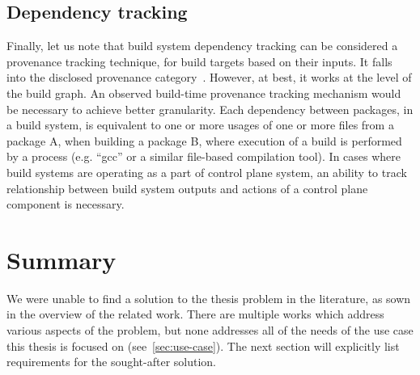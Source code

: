 \subsection{Dependency tracking}

Finally, let us note that build system dependency tracking can be considered a provenance tracking technique, for build targets based on their inputs. It falls into the disclosed provenance category~\cite{braun2006issues}. However, at best, it works at the level of the build graph. An observed build-time provenance tracking mechanism would be necessary to achieve better granularity. Each dependency between packages, in a build system, is equivalent to one or more usages of one or more files from a package A, when building a package B, where execution of a build is performed by a process (e.g. ``gcc''  or a similar file-based compilation tool).  In cases where build systems are operating as a part of control plane system, an ability to track relationship between build system outputs and actions of a control plane component is necessary.

\section{Summary}

We were unable to find a solution to the thesis problem in the literature, as sown in the overview of the related work. There are multiple works which address various aspects of the problem, but none addresses all of the needs of the use case this thesis is focused on (see~\cref{sec:use-case}). The next section will explicitly list requirements for the sought-after solution.